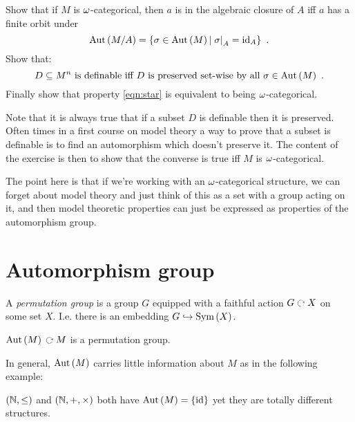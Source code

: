 \documentclass{amsart}
\begin{document}
\begin{exr}
Show that if $M$ is $\omega$-categorical, 
then $a$ is in the algebraic closure of $A$ iff $a$ has a finite orbit under
\begin{equation}
\operatorname{Aut}\left( M / A \right) = 
\left\{ \sigma \in \operatorname{Aut}\left( M \right) \, \middle\vert \, \left.\sigma \right\vert_{A} = \operatorname{id}_A \right\} \ .
\end{equation}
Show that:
\begin{equation}
D\subseteq M^n
\text{ is definable iff }
D \text{ is preserved set-wise
by all } \sigma\in \operatorname{Aut}\left( M \right) \ . 
\label{eqn:star}
\end{equation}
Finally show that property \eqref{eqn:star} is equivalent to being $\omega$-categorical.
\end{exr}

\begin{rmk}
Note that it is always true that if a subset $D$ is definable then it is preserved. 
Often times in a first course on model theory a way to prove that a subset is definable
is to find an automorphism which doesn't preserve it.
The content of the exercise is then to show that the converse is true iff $M$ is $\omega$-categorical.
\end{rmk}

The point here is that if we're working with an $\omega$-categorical 
structure, we can forget about model theory and just think of this as a set
with a group acting on it, and then model theoretic properties can just be expressed 
as properties of the automorphism group.

\section{Automorphism group}

\begin{defn}
A \emph{permutation group} is a group $G$
equipped with a faithful action $G\acts X$ on some set $X$. 
I.e. there is an embedding $G\hookrightarrow \operatorname{Sym}\left( X \right)$.
\end{defn}

\begin{exm}
$\Aut\left( M \right)\acts M$ is a permutation group.
\end{exm}

In general, $\operatorname{Aut}\left( M \right)$ carries little information about $M$
as in the following example:

\begin{exm}
$\left( \mathbb{N} , \leq \right)$ and $\left( \mathbb{N} , + , \times \right)$ both
have $\operatorname{Aut}\left( M \right) = \left\{ \operatorname{id} \right\}$ yet they are totally different structures.
\end{exm}
\end{document}

